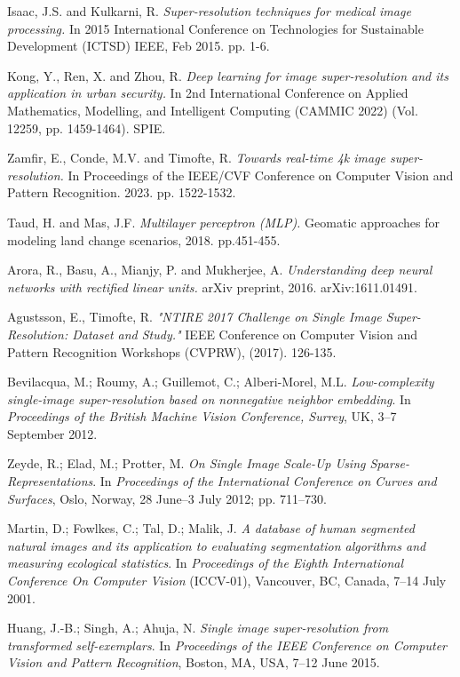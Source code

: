 \documentclass[twocolumn]{svjour3}          %
\begin{document}
\begin{thebibliography}{00}
 Isaac, J.S. and Kulkarni, R. \textit{Super-resolution techniques for medical image processing.} In 2015 International Conference on Technologies for Sustainable Development (ICTSD) IEEE, Feb 2015. pp. 1-6.

 Kong, Y., Ren, X. and Zhou, R. \textit{Deep learning for image super-resolution and its application in urban security.} In 2nd International Conference on Applied Mathematics, Modelling, and Intelligent Computing (CAMMIC 2022) (Vol. 12259, pp. 1459-1464). SPIE.

 Zamfir, E., Conde, M.V. and Timofte, R. \textit{Towards real-time 4k image super-resolution.} In Proceedings of the IEEE/CVF Conference on Computer Vision and Pattern Recognition. 2023. pp. 1522-1532.

 Taud, H. and Mas, J.F. \textit{Multilayer perceptron (MLP).} Geomatic approaches for modeling land change scenarios, 2018.  pp.451-455.

 Arora, R., Basu, A., Mianjy, P. and Mukherjee, A. \textit{Understanding deep neural networks with rectified linear units.} arXiv preprint, 2016. arXiv:1611.01491.

 Agustsson, E.,  Timofte, R. \textit{"NTIRE 2017 Challenge on Single Image Super-Resolution: Dataset and Study."} IEEE Conference on Computer Vision and Pattern Recognition Workshops (CVPRW), (2017). 126-135.

 Bevilacqua, M.; Roumy, A.; Guillemot, C.; Alberi-Morel, M.L. \textit{Low-complexity single-image super-resolution based on nonnegative neighbor embedding}. In \textit{Proceedings of the British Machine Vision Conference, Surrey}, UK, 3–7 September 2012.

 Zeyde, R.; Elad, M.; Protter, M. \textit{On Single Image Scale-Up Using Sparse-Representations}. In \textit{Proceedings of the International Conference on Curves and Surfaces}, Oslo, Norway, 28 June–3 July 2012; pp. 711–730.

 Martin, D.; Fowlkes, C.; Tal, D.; Malik, J. \textit{A database of human segmented natural images and its application to evaluating segmentation algorithms and measuring ecological statistics}. In \textit{Proceedings of the Eighth International Conference On Computer Vision} (ICCV-01), Vancouver, BC, Canada, 7–14 July 2001.

 Huang, J.-B.; Singh, A.; Ahuja, N. \textit{Single image super-resolution from transformed self-exemplars}. In \textit{Proceedings of the IEEE Conference on Computer Vision and Pattern Recognition}, Boston, MA, USA, 7–12 June 2015.


\end{thebibliography}
\end{document}

